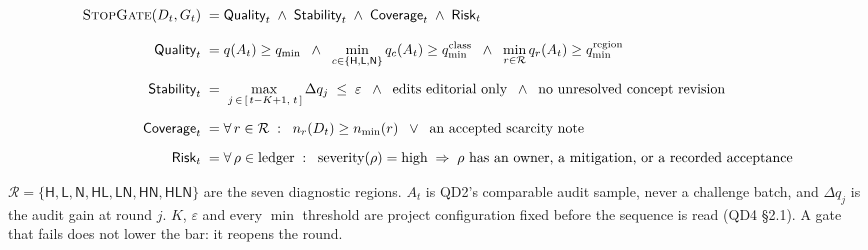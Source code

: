 %
%
%
%
\begin{align*}
\textsc{StopGate}(D_t, G_t) \;=\;&
  \textsf{Quality}_t \;\wedge\; \textsf{Stability}_t
  \;\wedge\; \textsf{Coverage}_t \;\wedge\; \textsf{Risk}_t \\[8pt]
%
\textsf{Quality}_t \;=\;&
  q(A_t) \geq q_{\min}
  \;\;\wedge\;\; \min_{c \in \{\textsf{H},\textsf{L},\textsf{N}\}} q_c(A_t) \geq q^{\text{class}}_{\min}
  \;\;\wedge\;\; \min_{r \in \mathcal{R}} q_r(A_t) \geq q^{\text{region}}_{\min} \\[6pt]
%
\textsf{Stability}_t \;=\;&
  \max_{\,j \,\in\, [\,t-K+1,\;t\,]} \Delta q_j \;\leq\; \varepsilon
  \;\;\wedge\;\; \text{edits editorial only}
  \;\;\wedge\;\; \text{no unresolved concept revision} \\[6pt]
%
\textsf{Coverage}_t \;=\;&
  \forall\, r \in \mathcal{R} \;:\;\;
  n_r(D_t) \geq n_{\min}(r)
  \;\;\vee\;\; \text{an accepted scarcity note} \\[6pt]
%
\textsf{Risk}_t \;=\;&
  \forall\, \rho \in \text{ledger} \;:\;\;
  \text{severity}(\rho) = \text{high}
  \;\Rightarrow\; \rho \text{ has an owner, a mitigation, or a recorded acceptance}
\end{align*}

\vspace{-4pt}
\noindent\footnotesize
$\mathcal{R} = \{\textsf{H},\textsf{L},\textsf{N},\textsf{HL},\textsf{LN},\textsf{HN},\textsf{HLN}\}$
are the seven diagnostic regions.
$A_t$ is QD2's comparable audit sample, never a challenge batch, and $\Delta q_j$ is the
audit gain at round $j$.
$K$, $\varepsilon$ and every $\min$ threshold are project configuration fixed before the
sequence is read (QD4 \S2.1).
A gate that fails does not lower the bar: it reopens the round.
